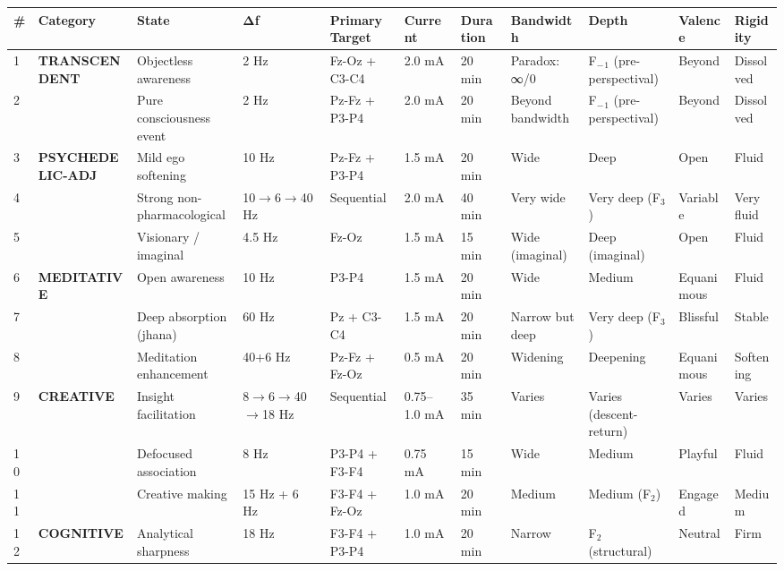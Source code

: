 \begin{longtable}{p{} p{} p{} p{} p{} p{} p{} p{} p{} p{} p{}}
\toprule
\textbf{\#} & \textbf{Category} & \textbf{State} & \textbf{Δf} & \textbf{Primary Target} & \textbf{Current} & \textbf{Duration} & \textbf{Bandwidth} & \textbf{Depth} & \textbf{Valence} & \textbf{Rigidity} \\
\midrule
\endhead
1 & \textbf{TRANSCENDENT} & Objectless awareness & 2 Hz & Fz-Oz + C3-C4 & 2.0 mA & 20 min & Paradox: ∞/0 & F$_{-}$$_1$ (pre-perspectival) & Beyond & Dissolved \\
2 &  & Pure consciousness event & 2 Hz & Pz-Fz + P3-P4 & 2.0 mA & 20 min & Beyond bandwidth & F$_{-}$$_1$ (pre-perspectival) & Beyond & Dissolved \\
3 & \textbf{PSYCHEDELIC-ADJ} & Mild ego softening & 10 Hz & Pz-Fz + P3-P4 & 1.5 mA & 20 min & Wide & Deep & Open & Fluid \\
4 &  & Strong non-pharmacological & 10$\rightarrow$6$\rightarrow$40 Hz & Sequential & 2.0 mA & 40 min & Very wide & Very deep (F$_3$) & Variable & Very fluid \\
5 &  & Visionary / imaginal & 4.5 Hz & Fz-Oz & 1.5 mA & 15 min & Wide (imaginal) & Deep (imaginal) & Open & Fluid \\
6 & \textbf{MEDITATIVE} & Open awareness & 10 Hz & P3-P4 & 1.5 mA & 20 min & Wide & Medium & Equanimous & Fluid \\
7 &  & Deep absorption (jhana) & 60 Hz & Pz + C3-C4 & 1.5 mA & 20 min & Narrow but deep & Very deep (F$_3$) & Blissful & Stable \\
8 &  & Meditation enhancement & 40+6 Hz & Pz-Fz + Fz-Oz & 0.5 mA & 20 min & Widening & Deepening & Equanimous & Softening \\
9 & \textbf{CREATIVE} & Insight facilitation & 8$\rightarrow$6$\rightarrow$40$\rightarrow$18 Hz & Sequential & 0.75–1.0 mA & 35 min & Varies & Varies (descent-return) & Varies & Varies \\
10 &  & Defocused association & 8 Hz & P3-P4 + F3-F4 & 0.75 mA & 15 min & Wide & Medium & Playful & Fluid \\
11 &  & Creative making & 15 Hz + 6 Hz & F3-F4 + Fz-Oz & 1.0 mA & 20 min & Medium & Medium (F$_2$) & Engaged & Medium \\
12 & \textbf{COGNITIVE} & Analytical sharpness & 18 Hz & F3-F4 + P3-P4 & 1.0 mA & 20 min & Narrow & F$_2$ (structural) & Neutral & Firm \\

\end{longtable}
